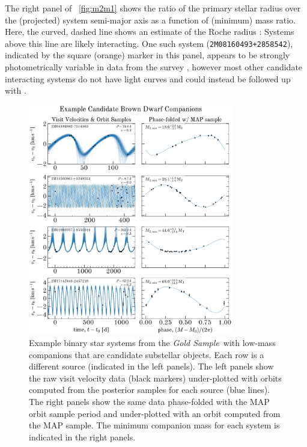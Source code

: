 \documentclass[modern]{aastex63}
\newcommand{\goldsample}{\textit{Gold Sample}}
\begin{document}
The right panel of \figurename~\ref{fig:m2m1} shows the ratio of the primary
stellar radius over the (projected) system semi-major axis as a function of
(minimum) mass ratio.
Here, the curved, dashed line shows an estimate of the Roche radius
\citep{Eggleton:1983}: Systems above this line are likely interacting.
One such system (\texttt{2M08160493+2858542}), indicated by the square (orange)
marker in this panel, appears to be strongly photometrically variable in data
from the  survey \citep{Shappee:2014, Jayasinghe:2019}, however
most other candidate interacting systems do not have  light
curves and could instead be followed up with  \citep{Ricker:2014}.

\begin{figure}[!t]
    \begin{center}
    \includegraphics[width=0.8\textwidth]{example-brown-dwarfs.pdf}
    \end{center}
    \caption{%
    Example binary star systems from the \goldsample\ with low-mass companions
    that are candidate substellar objects.
    Each row is a different source (indicated in the left panels).
    The left panels show the raw visit velocity data (black markers)
    under-plotted with orbits computed from the posterior samples for each
    source (blue lines).
    The right panels show the same data phase-folded with the MAP orbit sample
    period and under-plotted with an orbit computed from the MAP sample.
    The minimum companion mass for each system is indicated in the right panels.
    \label{fig:brown-dwarfs}
    }
\end{figure}
\end{document}
